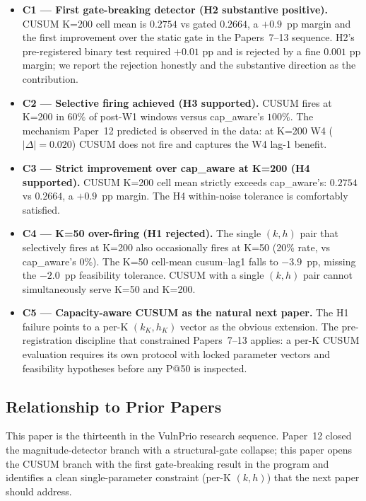 \begin{itemize}
\item \textbf{C1 --- First gate-breaking detector (H2 substantive
positive).} CUSUM K=200 cell mean is $0.2754$ vs gated $0.2664$, a
$+0.9$~pp margin and the first improvement over the static gate in
the Papers~7--13 sequence. H2's pre-registered binary test required
$+0.01$ pp and is rejected by a fine $0.001$ pp margin; we report
the rejection honestly and the substantive direction as the
contribution.

\item \textbf{C2 --- Selective firing achieved (H3 supported).}
CUSUM fires at K=200 in $60\%$ of post-W1 windows versus
cap\_aware's $100\%$. The mechanism Paper~12 predicted is observed
in the data: at K=200 W4 ($|\Delta| = 0.020$) CUSUM does not fire
and captures the W4 lag-1 benefit.

\item \textbf{C3 --- Strict improvement over cap\_aware at K=200
(H4 supported).} CUSUM K=200 cell mean strictly exceeds
cap\_aware's: $0.2754$ vs $0.2664$, a $+0.9$~pp margin. The H4
within-noise tolerance is comfortably satisfied.

\item \textbf{C4 --- K=50 over-firing (H1 rejected).} The single
$(k, h)$ pair that selectively fires at K=200 also occasionally
fires at K=50 (20\% rate, vs cap\_aware's 0\%). The K=50 cell-mean
cusum--lag1 falls to $-3.9$~pp, missing the $-2.0$~pp feasibility
tolerance. CUSUM with a single $(k, h)$ pair cannot simultaneously
serve K=50 and K=200.

\item \textbf{C5 --- Capacity-aware CUSUM as the natural next paper.}
The H1 failure points to a per-K $(k_K, h_K)$ vector as the obvious
extension. The pre-registration discipline that constrained
Papers~7--13 applies: a per-K CUSUM evaluation requires its own
protocol with locked parameter vectors and feasibility hypotheses
before any P@50 is inspected.
\end{itemize}

\subsection{Relationship to Prior Papers}

This paper is the thirteenth in the VulnPrio research sequence.
Paper~12 closed the magnitude-detector branch with a structural-gate
collapse; this paper opens the CUSUM branch with the first
gate-breaking result in the program and identifies a clean
single-parameter constraint (per-K $(k, h)$) that the next paper
should address.
